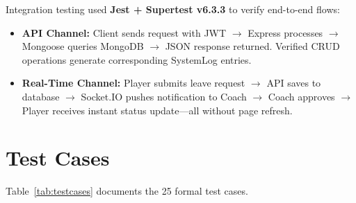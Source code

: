 \documentclass[12pt,a4paper,oneside]{report}
\begin{document}
Integration testing used \textbf{Jest + Supertest v6.3.3} to verify end-to-end flows:

\begin{itemize}[leftmargin=*]
  \item \textbf{API Channel:} Client sends request with JWT $\rightarrow$ Express processes $\rightarrow$ Mongoose queries MongoDB $\rightarrow$ JSON response returned. Verified CRUD operations generate corresponding SystemLog entries.
  \item \textbf{Real-Time Channel:} Player submits leave request $\rightarrow$ API saves to database $\rightarrow$ Socket.IO pushes notification to Coach $\rightarrow$ Coach approves $\rightarrow$ Player receives instant status update---all without page refresh.
\end{itemize}

\section{Test Cases}

Table~\ref{tab:testcases} documents the 25 formal test cases.
\end{document}
